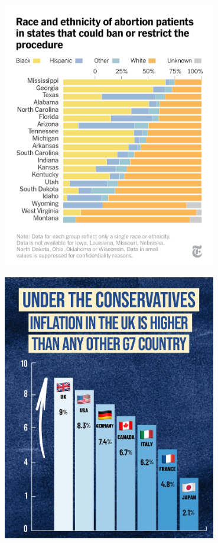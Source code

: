 \documentclass{beamer}
\begin{document}
 \begin{frame}\centering\includegraphics[width=0.7\textwidth,keepaspectratio]{graphcrimes/FSP19zkXIAAiUmi.png}\end{frame}
 \begin{frame}\centering\includegraphics[width=0.7\textwidth,keepaspectratio]{graphcrimes/FTME9qxWQAIZLbe.jpeg}\end{frame}
\end{document}
